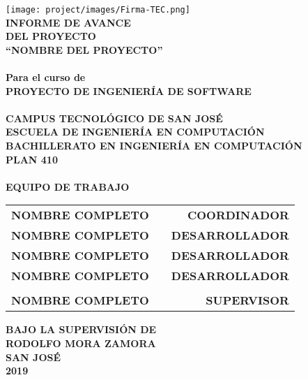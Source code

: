 \newpage
\begin{center}
\thispagestyle{empty}
\texttt{[image: project/images/Firma-TEC.png]}\\
\vspace{1cm}
\Large{\textbf{INFORME DE AVANCE\\ \large{DEL PROYECTO}}}\\[0.7cm]
\LARGE{\textsc {\textbf{``NOMBRE DEL PROYECTO''}}}\\[0.5cm]
\Large{\textbf{\\Para el curso de}}
\LARGE{\textbf{\\PROYECTO DE INGENIERÍA DE SOFTWARE\\}}
\vspace{0.5cm}
\Large{\textbf{\\CAMPUS TECNOLÓGICO DE SAN JOSÉ\\ESCUELA DE INGENIERÍA EN COMPUTACIÓN\\BACHILLERATO EN INGENIERÍA EN COMPUTACIÓN\\PLAN 410\\}}
\vspace{1cm}
\Large{\textbf{\\EQUIPO DE TRABAJO}}\\[0.3cm]
\begin{table}[h]
\centering
\large{
\begin{tabular}{>{\bfseries}lc>{\bfseries}r}
NOMBRE COMPLETO & & COORDINADOR\\ %
NOMBRE COMPLETO & & DESARROLLADOR\\
NOMBRE COMPLETO & & DESARROLLADOR\\
NOMBRE COMPLETO & & DESARROLLADOR\\
 & & \\
NOMBRE COMPLETO & & SUPERVISOR\\ %
\end{tabular}}
\end{table}
\vspace{0.5cm}
\large{\textbf{BAJO LA SUPERVISIÓN DE}}\\
\large{\textbf{RODOLFO MORA ZAMORA}}\\
\vspace{1cm}
\large{\textbf{SAN JOSÉ}}
\large{\textbf{\\2019}}\\
\vspace{1cm}
\newpage
\end{center}